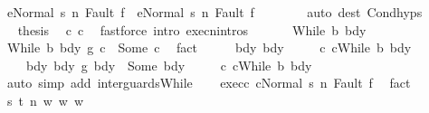 \begin{isabellebody}
\ {\isachardoublequoteopen}{\isasymGamma}{\isasymturnstile}{\isasymlangle}e{}{\isacharcomma}Normal\ s{\isasymrangle}\ {\isacharequal}n{\isasymRightarrow}\ Fault\ f\ {\isasymor}\ {\isasymGamma}{\isasymturnstile}{\isasymlangle}e{}{\isacharcomma}Normal\ s{\isasymrangle}\ {\isacharequal}n{\isasymRightarrow}\ Fault\ f{\isachardoublequoteclose}\isanewline
\ \ \ \ \ \ \isamarkupfalse%
\ {\isacharparenleft}auto\ dest{\isacharcolon}\ Cond{\isachardot}hyps{\isacharparenright}\isanewline
\ \ \ \ \isamarkupfalse%
\ \isamarkupfalse%
\ {\isacharquery}thesis\ \isamarkupfalse%
\ c{}\ c\ \isamarkupfalse%
\ {\isacharparenleft}fastforce\ intro{\isacharcolon}\ execn{\isachardot}intros{\isacharparenright}\isanewline
\ \ \isamarkupfalse%
\isanewline
{}\isamarkupfalse%
\isanewline
\ \ \isamarkupfalse%
\ {\isacharparenleft}While\ b\ bdy{}{\isacharparenright}\isanewline
\ \ \isamarkupfalse%
\ {\isachardoublequoteopen}{\isacharparenleft}While\ b\ bdy{}\ {\isasyminter}\isactrlsub g\ c{}{\isacharparenright}\ {\isacharequal}\ Some\ c{\isachardoublequoteclose}\ \isamarkupfalse%
\ fact\isanewline
\ \ \isamarkupfalse%
\ \isamarkupfalse%
\ bdy{}\ bdy\ \isanewline
\ \ \ \ c{}{\isacharcolon}\ {\isachardoublequoteopen}c{}{\isacharequal}While\ b\ bdy{}{\isachardoublequoteclose}\ \isanewline
\ \ \ \ bdy{\isacharcolon}\ {\isachardoublequoteopen}{\isacharparenleft}bdy{}\ {\isasyminter}\isactrlsub g\ bdy{}{\isacharparenright}\ {\isacharequal}\ Some\ bdy{\isachardoublequoteclose}\ \isanewline
\ \ \ \ c{\isacharcolon}\ {\isachardoublequoteopen}c{\isacharequal}While\ b\ bdy{\isachardoublequoteclose}\isanewline
\ \ \ \ \isamarkupfalse%
\ {\isacharparenleft}auto\ simp\ add{\isacharcolon}\ inter{\isacharunderscore}guards{\isacharunderscore}While{\isacharparenright}\isanewline
\ \ \isamarkupfalse%
\ exec{\isacharunderscore}c{\isacharcolon}\ {\isachardoublequoteopen}{\isasymGamma}{\isasymturnstile}{\isasymlangle}c{\isacharcomma}Normal\ s{\isasymrangle}\ {\isacharequal}n{\isasymRightarrow}\ Fault\ f{\isachardoublequoteclose}\ \isamarkupfalse%
\ fact\isanewline
\ \ \isacommand{{\isacharbraceleft}}\isamarkupfalse%
\isanewline
\ \ \ \ \isamarkupfalse%
\ s\ t\ n\ w\ w{}\ w{}\ \isanewline

\end{isabellebody}
